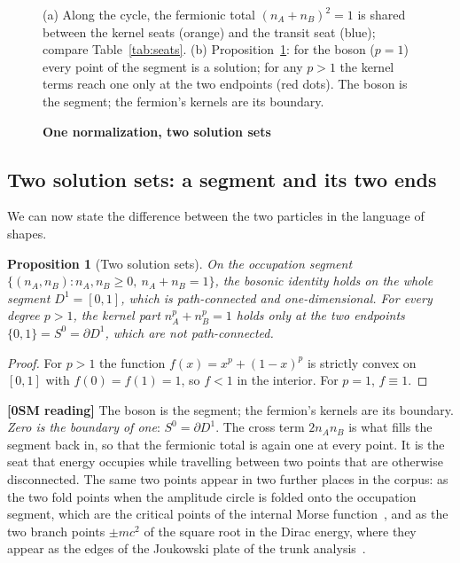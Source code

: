 \documentclass[%
 reprint, amsmath,amssymb, aps, prb, ]{revtex4-2}
\numberwithin{equation}{section}
\newtheorem{proposition}[theorem]{Proposition}
\begin{document}
\begin{figure}[t!]
\caption{\textbf{One normalization, two solution sets}}
\label{fig:seats}
\vspace{0.4em}
\begin{minipage}{0.95\textwidth}
\justifying\small
(a) Along the cycle, the fermionic total $(n_A+n_B)^2=1$ is shared between the kernel seats (orange) and the transit seat (blue); compare Table~\ref{tab:seats}. (b) Proposition~\ref{prop:sets}: for the boson ($p=1$) every point of the segment is a solution; for any $p>1$ the kernel terms reach one only at the two endpoints (red dots). The boson is the segment; the fermion's kernels are its boundary.
\end{minipage}
\end{figure}

\subsection{Two solution sets: a segment and its two ends}

We can now state the difference between the two particles in the language of shapes.

\begin{proposition}[Two solution sets]
\label{prop:sets}
On the occupation segment $\{(n_A,n_B):n_A,n_B\ge0,\ n_A+n_B=1\}$, the bosonic identity holds on the whole segment $D^1=[0,1]$, which is path-connected and one-dimensional. For every degree $p>1$, the kernel part $n_A^p+n_B^p=1$ holds only at the two endpoints $\{0,1\}=S^0=\partial D^1$, which are not path-connected.
\end{proposition}

\begin{proof}
For $p>1$ the function $f(x)=x^p+(1-x)^p$ is strictly convex on $[0,1]$ with $f(0)=f(1)=1$, so $f<1$ in the interior. For $p=1$, $f\equiv1$.
\end{proof}

\textbf{[0SM reading]} The boson is the segment; the fermion's kernels are its boundary. \emph{Zero is the boundary of one}: $S^0=\partial D^1$. The cross term $2n_An_B$ is what fills the segment back in, so that the fermionic total is again one at every point. It is the seat that energy occupies while travelling between two points that are otherwise disconnected. The same two points appear in two further places in the corpus: as the two fold points when the amplitude circle is folded onto the occupation segment, which are the critical points of the internal Morse function~\cite{ref:milnor}, and as the two branch points $\pm mc^2$ of the square root in the Dirac energy, where they appear as the edges of the Joukowski plate of the trunk analysis~\cite{ref:trunks}.
\end{document}

